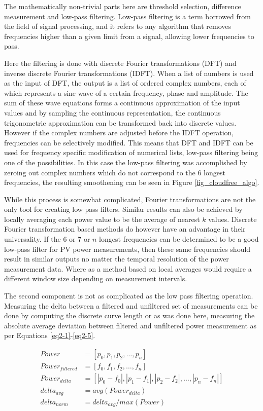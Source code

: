 \noindent The mathematically non-trivial parts here are threshold selection, difference measurement and low-pass filtering. Low-pass filtering is a term borrowed from the field of signal processing, and it refers to any algorithm that removes frequencies higher than a given limit from a signal, allowing lower frequencies to pass. 



Here the filtering is done with discrete Fourier transformations (DFT) and inverse discrete Fourier transformations (IDFT). When a list of numbers is used as the input of DFT, the output is a list of ordered complex numbers, each of which represents a sine wave of a certain frequency, phase and amplitude. The sum of these wave equations forms a continuous approximation of the input values and by sampling the continuous representation, the continuous trigonometric approximation can be transformed back into discrete values. However if the complex numbers are adjusted before the IDFT operation, frequencies can be selectively modified. This means that DFT and IDFT can be used for frequency specific modification of numerical lists, low-pass filtering being one of the possibilities. In this case the low-pass filtering was accomplished by zeroing out complex numbers which do not correspond to the 6 longest frequencies, the resulting smoothening can be seen in Figure \ref{fig_cloudfree_algo}.


While this process is somewhat complicated, Fourier transformations are not the only tool for creating low pass filters. Similar results can also be achieved by locally averaging each power value to be the average of nearest $k$ values. Discrete Fourier transformation based methods do however have an advantage in their universality. If the 6 or 7 or $n$ longest frequencies can be determined to be a good low-pass filter for PV power measurements, then these same frequencies should result in similar outputs no matter the temporal resolution of the power measurement data. Where as a method based on local averages would require a different window size depending on measurement intervals.

The second component is not as complicated as the low pass filtering operation. Measuring the delta between a filtered and unfiltered set of measurements can be done by computing the discrete curve length or as was done here, measuring the absolute average deviation between filtered and unfiltered power measurement as per Equations \ref{eq2-1}-\ref{eq2-5}.


\begin{align}
Power &= [p_0, p_1, p_2, \dots , p_n]   \label{eq2-1}\\ 
Power_{filtered} &= [f_0, f_1, f_2, \dots , f_n] \\
Power_{delta} &= [|p_0 - f_0|, |p_1-f_1|, |p_2-f_2|, \dots , |p_n-f_n|] \\
delta_{avg} &= avg(Power_{delta}) \\
delta_{norm} &= delta_{avg}/ max(Power) \label{eq2-5}
\end{align}


